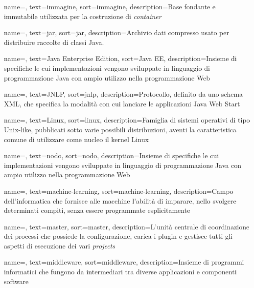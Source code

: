 {
    name=,
    text=immagine,
    sort=immagine,
    description={Base fondante e immutabile utilizzata per la costruzione di \textit{container}}
}

{
    name=,
    text=jar,
    sort=jar,
    description={Archivio dati compresso usato per distribuire raccolte di classi Java.}
}
 
{
    name=,
    text=Java Enterprise Edition,
    sort=Java EE,
    description={Insieme di specifiche le cui implementazioni vengono sviluppate in linguaggio di programmazione Java con ampio utilizzo nella programmazione Web}
}

{
    name=,
    text=JNLP,
    sort=jnlp,
    description={Protocollo, definito da uno schema XML, che specifica la modalità con cui lanciare le applicazioni Java Web Start}
}

{
    name=,
    text=Linux,
    sort=linux,
    description={Famiglia di sistemi operativi di tipo Unix-like, pubblicati sotto varie possibili distribuzioni, aventi la caratteristica comune di utilizzare come nucleo il kernel Linux}
}

{
    name=,
    text=nodo,
    sort=nodo,
    description={Insieme di specifiche le cui implementazioni vengono sviluppate in linguaggio di programmazione Java con ampio utilizzo nella programmazione Web}
}

{
    name=,
    text=machine-learning,
    sort=machine-learning,
    description={Campo dell'informatica che fornisce alle macchine l'abilità di imparare, nello svolgere determinati compiti, senza essere programmate esplicitamente}
}

{
    name=,
    text=master,
    sort=master,
    description={L'unità centrale di coordinazione dei processi che possiede la configurazione, carica i plugin e gestisce tutti gli aspetti di esecuzione dei vari \textit{projects}}
}

{
    name=,
    text=middleware,
    sort=middleware,
    description={Insieme di programmi informatici che fungono da intermediari tra diverse applicazioni e componenti software}
}

